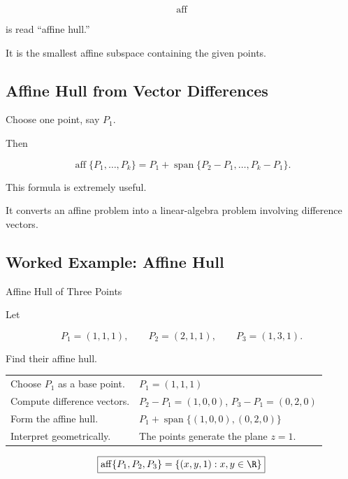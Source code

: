 \[ \operatorname{aff} \]

is read ``affine hull.''

It is the smallest affine subspace containing the given points.

\subsection{Affine Hull from Vector Differences}
\label{subsec:affine-hull-differences}

Choose one point, say \(P_1\).

Then

\[
\boxed{
\operatorname{aff}\{P_1,\ldots,P_k\}
=
P_1+
\operatorname{span}
\{P_2-P_1,\ldots,P_k-P_1\}.
}
\]

This formula is extremely useful.

It converts an affine problem into a linear-algebra problem involving
difference vectors.

\subsection{Worked Example: Affine Hull}
\label{subsec:worked-affine-hull}

\begin{workedexamplebox}{Affine Hull of Three Points}

Let

\[
P_1=(1,1,1),\qquad
P_2=(2,1,1),\qquad
P_3=(1,3,1).
\]

Find their affine hull.

\begin{tabularx}{\textwidth}{@{}>{\raggedright\arraybackslash}p{}X@{}}
Choose \(P_1\) as a base point. &
\(P_1=(1,1,1)\)\\
Compute difference vectors. &
\(P_2-P_1=(1,0,0)\), \quad \(P_3-P_1=(0,2,0)\)\\
Form the affine hull. &
\(P_1+\operatorname{span}\{(1,0,0),(0,2,0)\}\)\\
Interpret geometrically. &
The points generate the plane \(z=1\).
\end{tabularx}

\begin{answerbox}
\[ \boxed{\operatorname{aff}\{P_1,P_2,P_3\}=\{(x,y,1):x,y\in\R\}} \]
\end{answerbox}
\end{workedexamplebox}

